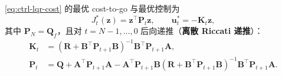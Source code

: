 \begin{theorem}
\label{thm:ctrl-lqr-dp}
\cref{eq:ctrl-lqr-cost} 的最优 cost-to-go 与最优控制为
\begin{equation}
  J_t^*(\mathbf{z})=\mathbf{z}^\top\mathbf{P}_t\mathbf{z},\qquad \mathbf{u}_t^*=-\mathbf{K}_t\mathbf{z},
\end{equation}
其中 $\mathbf{P}_N=\mathbf{Q}_f$，且对 $t=N-1,\dots,0$ 后向递推（\textbf{离散 Riccati 递推}）：
\begin{align}
  \mathbf{K}_t&=(\mathbf{R}+\mathbf{B}^\top\mathbf{P}_{t+1}\mathbf{B})^{-1}\mathbf{B}^\top\mathbf{P}_{t+1}\mathbf{A},\label{eq:ctrl-dlqr-K}\\
  \mathbf{P}_t&=\mathbf{Q}+\mathbf{A}^\top\mathbf{P}_{t+1}\mathbf{A}-\mathbf{A}^\top\mathbf{P}_{t+1}\mathbf{B}(\mathbf{R}+\mathbf{B}^\top\mathbf{P}_{t+1}\mathbf{B})^{-1}\mathbf{B}^\top\mathbf{P}_{t+1}\mathbf{A}.\label{eq:ctrl-dlqr-P}
\end{align}
\end{theorem}
